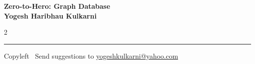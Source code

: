 \documentclass[8pt,landscape]{article}
\begin{document}
\footnotesize


\begin{center}
\Large{\textbf{Zero-to-Hero: Graph Database\\ Yogesh Haribhau Kulkarni}}  
\end{center}

\begin{multicols}{2}

\end{multicols}

\rule{\linewidth}{0.25pt}
\scriptsize
Copyleft \textcopyleft\  Send suggestions to 
\href{http://www.yogeshkulkarni.com}{yogeshkulkarni@yahoo.com}
\end{document}

